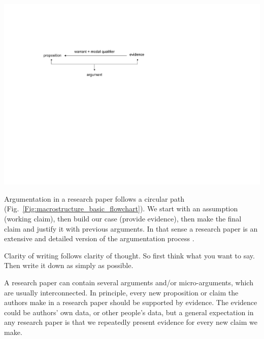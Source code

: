 \documentclass[graybox,envcountchap,sectrefs,UStrade]{svmono}
\begin{document}
\begin{flushleft}
 \includegraphics[width=.7\textwidth]{Fig_argumentation.pdf}
\end{flushleft}

Argumentation in a research paper follows a circular path (Fig.\@~\ref{Fig:macrostructure_basic_flowchart}). We start with an assumption (working claim), then build our case (provide evidence), then make the final claim and justify it with previous arguments. In that sense a research paper is an extensive and detailed version of the argumentation process \citep{turabian2007manual}. \par

\begin{svgraybox}
Clarity of writing follows clarity of thought. So first think what you want to say. Then write it down as simply as possible.
\end{svgraybox}

A research paper can contain several arguments and/or micro-arguments, which are usually interconnected. In principle, every new proposition or claim the authors make in a research paper should be supported by evidence. The evidence could be authors' own data, or other people's data, but a general expectation in any research paper is that we repeatedly present evidence for every new claim we make.\par
\end{document}
